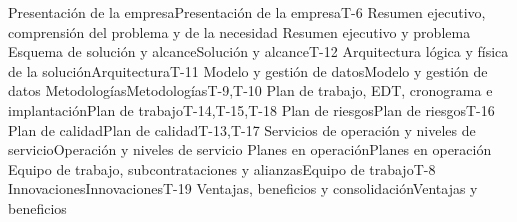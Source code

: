 %
%

  {Presentación de la empresa}{Presentación de la empresa}{T-6}
  {Resumen ejecutivo, comprensión del problema y de la necesidad}
  {Resumen ejecutivo y problema}{}
  {Esquema de solución y alcance}{Solución y alcance}{T-12}
  {Arquitectura lógica y física de la solución}{Arquitectura}{T-11}
  {Modelo y gestión de datos}{Modelo y gestión de datos}{}
  {Metodologías}{Metodologías}{T-9,T-10}
  {Plan de trabajo, EDT, cronograma e implantación}{Plan de trabajo}{T-14,T-15,T-18}
  {Plan de riesgos}{Plan de riesgos}{T-16}
  {Plan de calidad}{Plan de calidad}{T-13,T-17}
  {Servicios de operación y niveles de servicio}{Operación y niveles de servicio}{}
  {Planes en operación}{Planes en operación}{}
  {Equipo de trabajo, subcontrataciones y alianzas}{Equipo de trabajo}{T-8}
  {Innovaciones}{Innovaciones}{T-19}
  {Ventajas, beneficios y consolidación}{Ventajas y beneficios}{}


